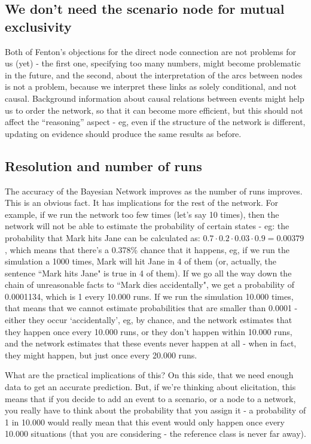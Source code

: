 \subsection{We don't need the scenario node for mutual exclusivity}
Both of Fenton's objections for the direct node connection are not problems for us (yet) - the first one, specifying too many numbers, might become problematic in the future, and the second, about the interpretation of the arcs between nodes is not a problem, because we interpret these links as solely conditional, and not causal. Background information about causal relations between events might help us to order the network, so that it can become more efficient, but this should not affect the ``reasoning'' aspect - eg, even if the structure of the network is different, updating on evidence should produce the same results as before.


\subsection{Resolution and number of runs}
The accuracy of the Bayesian Network improves as the number of runs improves. This is an obvious fact. It has implications for the rest of the network. For example, if we run the network too few times (let's say 10 times), then the network will not be able to estimate the probability of certain states - eg: the probability that Mark hits Jane can be calculated as: $0.7 \cdot 0.2 \cdot 0.03 \cdot 0.9 = 0.00379$, which means that there's a 0.378\% chance that it happens, eg, if we run the simulation a 1000 times, Mark will hit Jane in 4 of them (or, actually, the sentence ``Mark hits Jane" is true in 4 of them). If we go all the way down the chain of unreasonable facts to ``Mark dies accidentally", we get a probability of 0.0001134, which is 1 every 10.000 runs. If we run the simulation 10.000 times, that means that we cannot estimate probabilities that are smaller than 0.0001 - either they occur `accidentally', eg, by chance, and the network estimates that they happen once every 10.000 runs, or they don't happen within 10.000 runs, and the network estimates that these events never happen at all - when in fact, they might happen, but just once every 20.000 runs.

What are the practical implications of this? On this side, that we need enough data to get an accurate prediction. But, if we're thinking about elicitation, this means that if you decide to add an event to a scenario, or a node to a network, you really have to think about the probability that you assign it - a probability of 1 in 10.000 would really mean that this event would only happen once every 10.000 situations (that you are considering - the reference class is never far away). 



